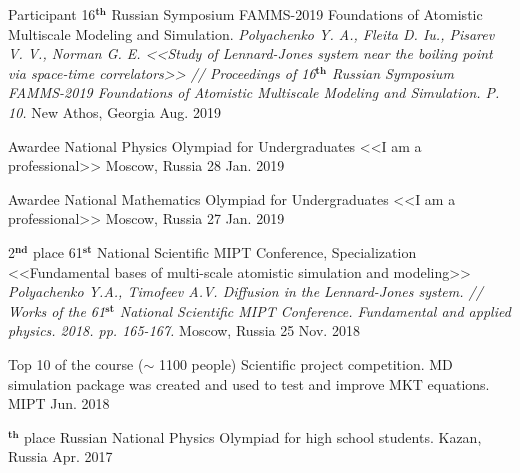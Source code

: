
\begin{cvhonors}

  \cvhonor
    {Participant} %
    {16$^{\textbf{th}}$ Russian Symposium FAMMS-2019 Foundations of Atomistic Multiscale Modeling and Simulation. \newline \textit{Polyachenko Y. A., Fleita D. Iu., Pisarev V. V., Norman G. E. <<Study of Lennard-Jones system near the boiling point via space-time correlators>> // Proceedings of 16$^{\textbf{th}}$ Russian Symposium FAMMS-2019 Foundations of Atomistic Multiscale Modeling and Simulation. P. 10.}} %
    {New Athos, Georgia} %
    {Aug. 2019} %
    
  \cvhonor
    {Awardee} %
    {National Physics Olympiad for Undergraduates <<I am a professional>>} %
    {Moscow, Russia} %
    {28 Jan. 2019} %
    
    
  \cvhonor
    {Awardee} %
    {National Mathematics Olympiad for Undergraduates <<I am a professional>>} %
    {Moscow, Russia} %
    {27 Jan. 2019} %
    
  \cvhonor
    {2$^{\textbf{nd}}$ place} %
    {61$^{\textbf{st}}$ National Scientific MIPT Conference, Specialization <<Fundamental bases of multi-scale atomistic simulation and modeling>> \newline \textit{Polyachenko Y.A., Timofeev A.V. Diffusion in the Lennard-Jones system. // Works of the 61$^{\textbf{st}}$ National Scientific MIPT Conference. Fundamental and applied physics. 2018. pp. 165-167.} \newline} %
    {Moscow, Russia} %
    {25 Nov. 2018} %
    
  \cvhonor
    {Top 10 of the course ($\sim$ 1100 people)} %
    {Scientific project competition. MD simulation package was created and used to test and improve MKT equations.} %
    {MIPT} %
    {Jun. 2018} %

  \cvhonor
    {$^{\textbf{th}}$ place} %
    {Russian National Physics Olympiad for high school students. \newline} %
    {Kazan, Russia} %
    {Apr. 2017} %
	
\end{cvhonors}
